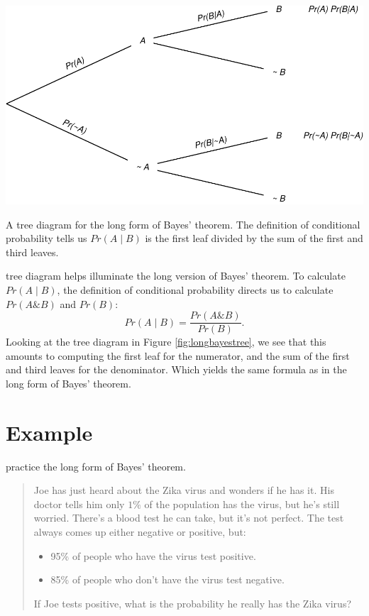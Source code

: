 \documentclass[justified]{tufte-book}
\providecommand{\tightlist}{%
  \setlength{\itemsep}{0pt}\setlength{\parskip}{0pt}}
\newcommand{\given}{\mid}
\renewcommand{\wedge}{\mathbin{\&}}
\newcommand{\p}{Pr}
\newenvironment{problem}{\begin{quote}\normalsize}{\end{quote}}
\theoremstyle{definition}
\theoremstyle{definition}
\theoremstyle{definition}
\theoremstyle{remark}
\begin{document}
\begin{marginfigure}
\includegraphics{_main_files/figure-latex/longbayestree-1} \caption[A tree diagram for the long form of Bayes' theorem]{A tree diagram for the long form of Bayes' theorem. The definition of conditional probability tells us $\p(A \given B)$ is the first leaf divided by the sum of the first and third leaves.}\label{fig:longbayestree}
\end{marginfigure}

 tree diagram helps illuminate the long version of Bayes'
theorem. To calculate \(\p(A \given B)\), the definition of conditional
probability directs us to calculate \(\p(A \wedge B)\) and \(\p(B)\):
\[ \p(A \given B) = \frac{ \p(A \wedge B) }{ \p(B) }. \] Looking at the
tree diagram in Figure \ref{fig:longbayestree}, we see that this amounts
to computing the first leaf for the numerator, and the sum of the first
and third leaves for the denominator. Which yields the same formula as
in the long form of Bayes' theorem.

\hypertarget{example-1}{%
\section{Example}\label{example-1}}

 practice the long form of Bayes' theorem.

\begin{problem}
Joe has just heard about the Zika virus and wonders if he has it. His
doctor tells him only \(1\%\) of the population has the virus, but he's
still worried. There's a blood test he can take, but it's not perfect.
The test always comes up either negative or positive, but:

\begin{itemize}
\tightlist
\item
  95\% of people who have the virus test positive.
\item
  85\% of people who don't have the virus test negative.
\end{itemize}

If Joe tests positive, what is the probability he really has the Zika
virus?
\end{problem}
\end{document}
